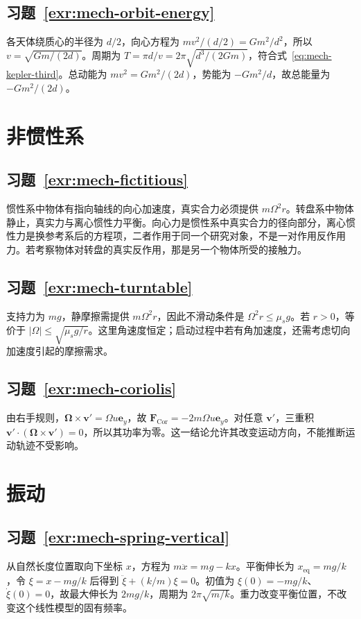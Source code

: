 \documentclass[UTF8,12pt,a4paper,fontset=fandol]{ctexbook}
\begin{document}
\subsection*{习题~\ref{exr:mech-orbit-energy}}
各天体绕质心的半径为 $d/2$，向心方程为 $mv^2/(d/2)=Gm^2/d^2$，所以 $v=\sqrt{Gm/(2d)}$。周期为 $T=\pi d/v=2\pi\sqrt{d^3/(2Gm)}$，符合式~\eqref{eq:mech-kepler-third}。总动能为 $mv^2=Gm^2/(2d)$，势能为 $-Gm^2/d$，故总能量为 $-Gm^2/(2d)$。

\section{非惯性系}
\subsection*{习题~\ref{exr:mech-fictitious}}
惯性系中物体有指向轴线的向心加速度，真实合力必须提供 $m\Omega^2r$。转盘系中物体静止，真实力与离心惯性力平衡。向心力是惯性系中真实合力的径向部分，离心惯性力是换参考系后的方程项，二者作用于同一个研究对象，不是一对作用反作用力。若考察物体对转盘的真实反作用，那是另一个物体所受的接触力。

\subsection*{习题~\ref{exr:mech-turntable}}
支持力为 $mg$，静摩擦需提供 $m\Omega^2r$，因此不滑动条件是 $\Omega^2r\le\mu_sg$。若 $r>0$，等价于 $|\Omega|\le\sqrt{\mu_sg/r}$。这里角速度恒定；启动过程中若有角加速度，还需考虑切向加速度引起的摩擦需求。

\subsection*{习题~\ref{exr:mech-coriolis}}
由右手规则，$\boldsymbol\Omega\times\mathbf v'=\Omega u\mathbf e_y$，故 $\mathbf F_{\mathrm{Cor}}=-2m\Omega u\mathbf e_y$。对任意 $\mathbf v'$，三重积 $\mathbf v'\cdot(\boldsymbol\Omega\times\mathbf v')=0$，所以其功率为零。这一结论允许其改变运动方向，不能推断运动轨迹不受影响。

\section{振动}
\subsection*{习题~\ref{exr:mech-spring-vertical}}
从自然长度位置取向下坐标 $x$，方程为 $m\ddot x=mg-kx$。平衡伸长为 $x_{\mathrm{eq}}=mg/k$，令 $\xi=x-mg/k$ 后得到 $\ddot\xi+(k/m)\xi=0$。初值为 $\xi(0)=-mg/k$、$\dot\xi(0)=0$，故最大伸长为 $2mg/k$，周期为 $2\pi\sqrt{m/k}$。重力改变平衡位置，不改变这个线性模型的固有频率。
\end{document}
